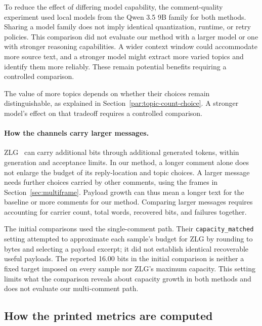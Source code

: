 \label{par:baseline-model-scale}
To reduce the effect of differing model capability, the comment-quality experiment used local models from the Qwen 3.5 9B family for both methods. Sharing a model family does not imply identical quantization, runtime, or retry policies. This comparison did not evaluate our method with a larger model or one with stronger reasoning capabilities. A wider context window could accommodate more source text, and a stronger model might extract more varied topics and identify them more reliably. These remain potential benefits requiring a controlled comparison.

The value of more topics depends on whether their choices remain distinguishable, as explained in Section~\ref{par:topic-count-choice}. A stronger model's effect on that tradeoff requires a controlled comparison.

\paragraph{How the channels carry larger messages.}
\label{par:baseline-capacity}
ZLG~\cite{lin2024zero} can carry additional bits through additional generated tokens, within generation and acceptance limits. In our method, a longer comment alone does not enlarge the budget of its reply-location and topic choices. A larger message needs further choices carried by other comments, using the frames in Section~\ref{sec:multiframe}. Payload growth can thus mean a longer text for the baseline or more comments for our method. Comparing larger messages requires accounting for carrier count, total words, recovered bits, and failures together.

The initial comparisons used the single-comment path. Their \texttt{capacity\_matched} setting attempted to approximate each sample's budget for ZLG by rounding to bytes and selecting a payload excerpt; it did not establish identical recoverable useful payloads. The reported 16.00 bits in the initial comparison is neither a fixed target imposed on every sample nor ZLG's maximum capacity. This setting limits what the comparison reveals about capacity growth in both methods and does not evaluate our multi-comment path.

\subsection{How the printed metrics are computed}

